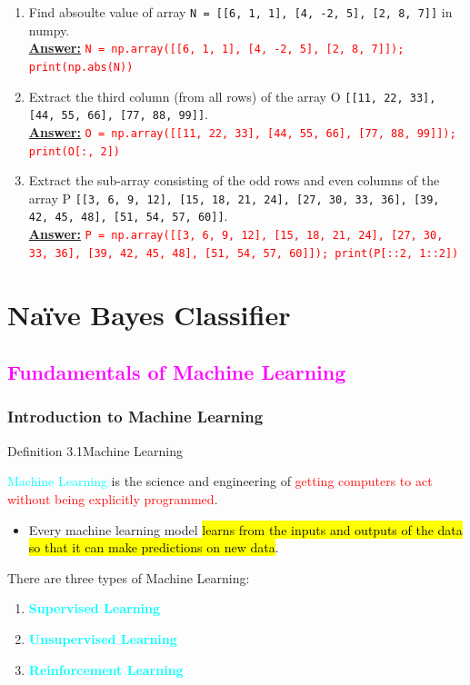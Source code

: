 \documentclass{book}
\begin{document}
\begin{enumerate}
    \vspace{1.5mm}
    \item Find absoulte value of array \texttt{N = [[6, 1, 1], [4, -2, 5], [2, 8, 7]]} in numpy.\\
    \underline{\textbf{Answer:}} \textcolor{red}{\texttt{N = np.array([[6, 1, 1], [4, -2, 5], [2, 8, 7]]); print(np.abs(N))}}
    \vspace{1.5mm}
    \item Extract the third column (from all rows) of the array O \texttt{[[11, 22, 33], [44, 55, 66], [77, 88, 99]]}.\\
    \underline{\textbf{Answer:}} \textcolor{red}{\texttt{O = np.array([[11, 22, 33], [44, 55, 66], [77, 88, 99]]); print(O[:, 2])}}
    \vspace{1.5mm}
    \item Extract the sub-array consisting of the odd rows and even columns of the array P \texttt{[[3, 6, 9, 12], [15, 18, 21, 24], [27, 30, 33, 36], [39, 42, 45, 48], [51, 54, 57, 60]]}.\\
    \underline{\textbf{Answer:}} \textcolor{red}{\texttt{P = np.array([[3, 6, 9, 12], [15, 18, 21, 24], [27, 30, 33, 36], [39, 42, 45, 48], [51, 54, 57, 60]]); print(P[::2, 1::2])}}
\end{enumerate}

\chapter{Naïve Bayes Classifier}
\textcolor{magenta}{\section{\textbf{Fundamentals of Machine Learning}}}
\subsection{Introduction to Machine Learning}
\begin{defBox}{Definition 3.1}{Machine Learning}
    \raggedright
    \textcolor{cyan}{Machine Learning} is the science and engineering of \textcolor{red}{getting computers to act without being explicitly programmed}.\\
    \begin{itemize}
        \item Every machine learning model \hl{learns from the inputs and outputs of the data so that it can make predictions on new data}.
    \end{itemize}
\end{defBox}
There are three types of Machine Learning:
\begin{enumerate}
    \item \textcolor{cyan}{\textbf{Supervised Learning}}
    \item \textcolor{cyan}{\textbf{Unsupervised Learning}}
    \item \textcolor{cyan}{\textbf{Reinforcement Learning}} 
\end{enumerate}
\end{document}
